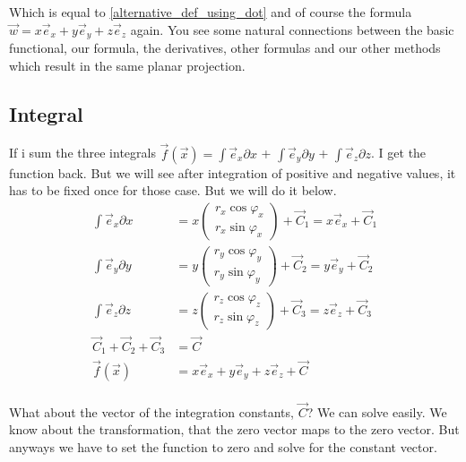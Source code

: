 \documentclass[a4paper]{article}
\begin{document}
Which is equal to \ref{alternative_def_using_dot} and of course the formula $\vec{w} = x\vec{e}_{x}+y\vec{e}_{y}+z\vec{e}_{z}$ again. You see some natural connections between the basic functional, our formula, the derivatives, other formulas and our other methods which result in the same planar projection.\\

\subsection{Integral}

If i sum the three integrals $\vec{f}(\vec{x}) = \int\vec{e}_{x}\partial{x}$ + $\int\vec{e}_{y}\partial{y}$ + $\int\vec{e}_{z}\partial{z}$. I get the function back. But we will see after integration of positive and negative values, it has to be fixed once for those case. But we will do it below.\\

\begin{displaymath}
\begin{align}
\int\vec{e}_{x}\partial{x} &= x\begin{pmatrix}r_x\cos\varphi_x\\r_x\sin\varphi_x\end{pmatrix} + \vec{C}_{1} = x\vec{e}_{x} + \vec{C}_{1}\\
\int\vec{e}_{y}\partial{y} &= y\begin{pmatrix}r_y\cos\varphi_y\\r_y\sin\varphi_y\end{pmatrix} + \vec{C}_{2} = y\vec{e}_{y} + \vec{C}_{2}\\
\int\vec{e}_{z}\partial{z} &= z\begin{pmatrix}r_z\cos\varphi_z\\r_z\sin\varphi_z\end{pmatrix} + \vec{C}_{3} = z\vec{e}_{z} + \vec{C}_{3}\\
\vec{C}_{1} + \vec{C}_{2} + \vec{C}_{3} &= \vec{C}\\
\vec{f}(\vec{x}) &= x\vec{e}_{x} +y\vec{e}_{y} +z\vec{e}_{z} + \vec{C}\\
\end{align}
\end{displaymath}

What about the vector of the integration constants, $\vec{C}$? We can solve easily. We know about the transformation, that the zero vector maps to the zero vector. But anyways we have to set the function to zero and solve for the constant vector.\\
\end{document}
